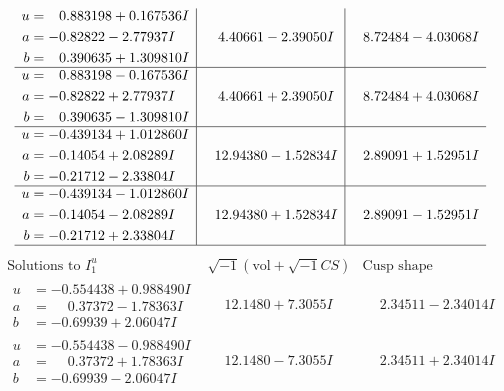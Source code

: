 \documentclass[1p]{elsarticle_modified}
\theoremstyle{definition}
\newcommand{\I}{\sqrt{-1}}
\begin{document}
$$\begin{array}{c|c|c}
\begin{aligned}
u &= \phantom{-}0.883198 + 0.167536 I \\
a &= -0.82822 - 2.77937 I \\
b &= \phantom{-}0.390635 + 1.309810 I\end{aligned}
 & \phantom{-}4.40661 - 2.39050 I & \phantom{-}8.72484 - 4.03068 I \\ \hline\begin{aligned}
u &= \phantom{-}0.883198 - 0.167536 I \\
a &= -0.82822 + 2.77937 I \\
b &= \phantom{-}0.390635 - 1.309810 I\end{aligned}
 & \phantom{-}4.40661 + 2.39050 I & \phantom{-}8.72484 + 4.03068 I \\ \hline\begin{aligned}
u &= -0.439134 + 1.012860 I \\
a &= -0.14054 + 2.08289 I \\
b &= -0.21712 - 2.33804 I\end{aligned}
 & \phantom{-}12.94380 - 1.52834 I & \phantom{-}2.89091 + 1.52951 I \\ \hline\begin{aligned}
u &= -0.439134 - 1.012860 I \\
a &= -0.14054 - 2.08289 I \\
b &= -0.21712 + 2.33804 I\end{aligned}
 & \phantom{-}12.94380 + 1.52834 I & \phantom{-}2.89091 - 1.52951 I\\
 \hline 
 \end{array}$$\newpage$$\begin{array}{c|c|c}  
\text{Solutions to }I^u_{1}& \I (\text{vol} + \sqrt{-1}CS) & \text{Cusp shape}\\
 \hline 
\begin{aligned}
u &= -0.554438 + 0.988490 I \\
a &= \phantom{-}0.37372 - 1.78363 I \\
b &= -0.69939 + 2.06047 I\end{aligned}
 & \phantom{-}12.1480 + 7.3055 I & \phantom{-}2.34511 - 2.34014 I \\ \hline\begin{aligned}
u &= -0.554438 - 0.988490 I \\
a &= \phantom{-}0.37372 + 1.78363 I \\
b &= -0.69939 - 2.06047 I\end{aligned}
 & \phantom{-}12.1480 - 7.3055 I & \phantom{-}2.34511 + 2.34014 I \\ \hline\begin{aligned}

\end{aligned}
\end{array}$$
\end{document}
